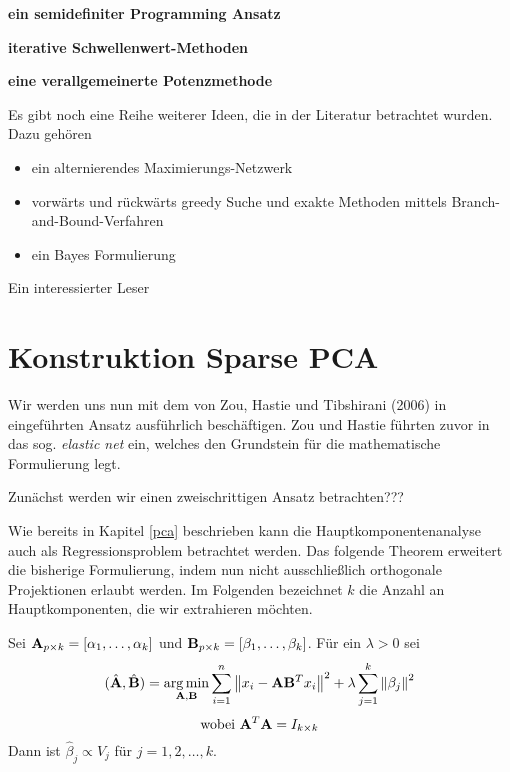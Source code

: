 \textbf{ein semidefiniter Programming Ansatz}

\textbf{iterative Schwellenwert-Methoden}

\textbf{eine verallgemeinerte Potenzmethode}

Es gibt noch eine Reihe weiterer Ideen, die in der Literatur betrachtet wurden. Dazu gehören
\begin{itemize}
\item ein alternierendes Maximierungs-Netzwerk \cite{richtarik}
\item vorwärts und rückwärts greedy Suche und exakte Methoden mittels Branch-and-Bound-Verfahren \cite{moghaddam}
\item ein Bayes Formulierung \cite{guan}
\end{itemize}

Ein interessierter Leser 




\section{Konstruktion Sparse PCA} \label{construction}

Wir werden uns nun mit dem von Zou, Hastie und Tibshirani (2006) in \cite{zou_sparsepca} eingeführten Ansatz ausführlich beschäftigen. Zou und Hastie führten zuvor in \cite{zou_elasticnet} das sog. \textit{elastic net} ein, welches den Grundstein für die mathematische Formulierung legt.

Zunächst werden wir einen zweischrittigen Ansatz betrachten???

Wie bereits in Kapitel \ref{pca} beschrieben kann die Hauptkomponentenanalyse auch als Regressionsproblem betrachtet werden. Das folgende Theorem erweitert die bisherige Formulierung, indem nun nicht ausschließlich orthogonale Projektionen erlaubt werden. 
Im Folgenden bezeichnet $k$ die Anzahl an Hauptkomponenten, die wir extrahieren möchten.

\begin{thm} \label{pca_regression_formulation_ridge}
Sei $\mathbf{A}_{p \times k} = [ \alpha_1, \ldots ,\alpha_k ]$ und $\mathbf{B}_{p \times k} = [ \beta_1, \ldots ,\beta_k ]$. Für ein $\lambda > 0$ sei
$$(\hat{\mathbf{A}}, \hat{\mathbf{B}}) = \operatorname*{arg\,min}_{\mathbf{A}, \mathbf{B}} \sum_{i=1}^{n} \left\lVert x_i - \mathbf{A}\mathbf{B}^Tx_i \right\rVert^2 + \lambda \sum_{j=1}^{k}\left\lVert \beta_j \right\rVert^2$$
$$\text{wobei } \mathbf{A}^T\mathbf{A} = I_{k \times k}$$
Dann ist $\hat{\beta}_j \propto V_j$ für $j = 1,2,\ldots,k$. 
\end{thm}

